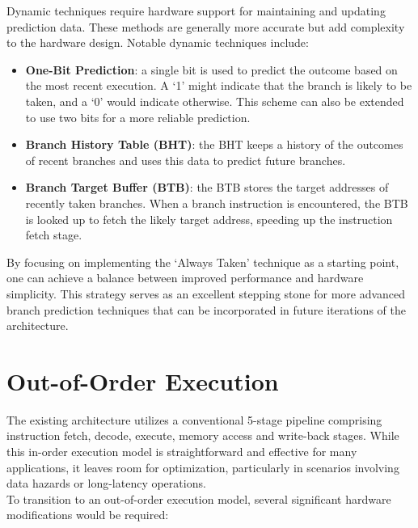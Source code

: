 Dynamic techniques require hardware support for maintaining and updating prediction data. These methods are generally more accurate but add complexity to the hardware design. Notable dynamic techniques include:

\begin{itemize}
    \item \textbf{One-Bit Prediction}: a single bit is used to predict the outcome based on the most recent execution. A `1' might indicate that the branch is likely to be taken, and a `0' would indicate otherwise. This scheme can also be extended to use two bits for a more reliable prediction.
    
    \item \textbf{Branch History Table (BHT)}: the BHT keeps a history of the outcomes of recent branches and uses this data to predict future branches.
    
    \item \textbf{Branch Target Buffer (BTB)}: the BTB stores the target addresses of recently taken branches. When a branch instruction is encountered, the BTB is looked up to fetch the likely target address, speeding up the instruction fetch stage.
\end{itemize}

By focusing on implementing the `Always Taken' technique as a starting point, one can achieve a balance between improved performance and hardware simplicity. This strategy serves as an excellent stepping stone for more advanced branch prediction techniques that can be incorporated in future iterations of the architecture.

\section{Out-of-Order Execution}
The existing architecture utilizes a conventional 5-stage pipeline comprising instruction fetch, decode, execute, memory access and write-back stages. While this in-order execution model is straightforward and effective for many applications, it leaves room for optimization, particularly in scenarios involving data hazards or long-latency operations. \\

To transition to an out-of-order execution model, several significant hardware modifications would be required:

